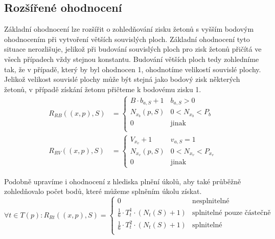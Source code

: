 \subsection{Rozšířené ohodnocení}

Základní ohodnocení lze rozšířit o zohledňování zisku žetonů s vyšším bodovým ohodnocením při vytvoření větších souvislých ploch. Základní ohodnocení tyto situace nerozlišuje, jelikož při budování souvislých ploch pro zisk žetonů přičítá ve všech případech vždy stejnou konstantu. Budování větších ploch tedy zohledníme tak, že v případě, který by byl ohodnocen 1, ohodnotíme velikostí souvislé plochy. Jelikož velikost souvislé plochy může být stejná jako bodový zisk některých žetonů, v případě získání žetonu přičteme k bodovému zisku 1.
\begin{align}
     R_{RB}((x,p),S) &= 
    \begin{cases}
        B\cdot b_{a,S} + 1    & b_{a,S} > 0 \\
        N_{x_b}(p,S)          & 0 < N_{x_b} < P_b\\
        0                     & \text{jinak}
        \label{eq:rozsireniBarva}\\
    \end{cases} \\
    R_{RV}((x,p),S) &= 
        \begin{cases}
            V_{x_v} + 1       & v_{a,S} = 1\\
            N_{x_v}(p,S)      & 0 < N_{x_v} < P_{x_v}\\
            0                 & \text{jinak}
            \label{eq:rozsireniVzor}
        \end{cases}
\end{align}

Podobně upravíme i ohodnocení z hlediska plnění úkolů, aby také průběžně zohledňovalo počet bodů, které můžeme splněním úkolu získat.
\begin{equation}
    \forall t \in T(p): R_{Rt}((x,p),S) =
    \begin{cases}
        0                                           & \text{nesplnitelné} \\
        \frac{1}{6}\cdot T_t^1 \cdot (N_t(S)+1)     & \text{splnitelné pouze částečně}\\
        \frac{1}{6}\cdot T_t^2 \cdot (N_t(S)+1)     & \text{splnitelné}\\
    \end{cases}
\end{equation}

